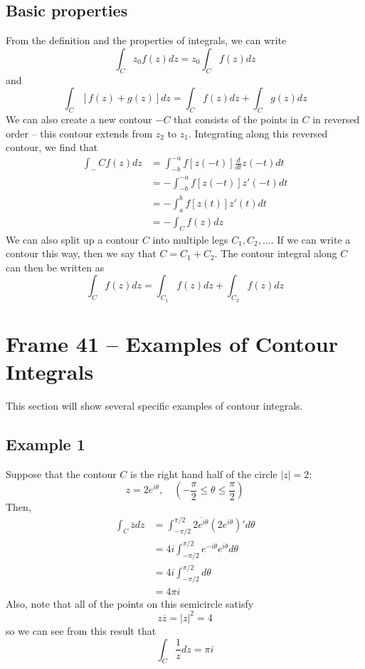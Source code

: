 \documentclass{article}
\renewcommand{\bar}{\overline}
\begin{document}
\subsection{Basic properties}
From the definition and the properties of integrals, we can write
\[
	\int_C z_0 f(z) dz = z_0 \int_C f(z) dz
\]
and
\[
	\int_C [f(z) + g(z)] dz = \int_C f(z) dz + \int_C g(z) dz
\]
We can also create a new contour $-C$ that consists of the points in $C$ in reversed order -- this contour extends from $z_2$ to $z_1$. Integrating along this reversed contour, we find that
\begin{align*}
	\int_-C f(z) dz 
	&= \int_{-b}^{-a} f[z(-t)] \frac{d}{dt} z(-t) dt \\
	&= -\int_{-b}^{-a} f[z(-t)] z'(-t) dt \\
	&= -\int_a^b f[z(t)] z'(t) dt \\
	&= -\int_C f(z) dz
\end{align*}
We can also split up a contour $C$ into multiple legs $C_1, C_2, \dots$. If we can write a contour this way, then we say that $C = C_1 + C_2$. The contour integral along $C$ can then be written as
\[
	\int_C f(z) dz = \int_{C_1} f(z) dz + \int_{C_2} f(z) dz
\]


\clearpage
\section{Frame 41 -- Examples of Contour Integrals}
This section will show several specific examples of contour integrals.

\subsection{Example 1}
Suppose that the contour $C$ is the right hand half of the circle $|z| = 2$:
\[
	z = 2e^{i\theta},	\quad \left( -\frac{\pi}{2} \le \theta \le \frac{\pi}{2}\right)
\]
Then,
\begin{align*}
	\int_C \bar{z} dz
	&= \int_{-\pi/2}^{\pi/2} \bar{2e^{i\theta}} (2e^{i\theta})' d\theta \\
	&= 4i\int_{-\pi/2}^{\pi/2} e^{-i\theta} e^{i\theta} d\theta \\
	&= 4i\int_{-\pi/2}^{\pi/2} d\theta \\
	&= 4\pi i
\end{align*}
Also, note that all of the points on this semicircle satisfy
\[
	z \bar{z} = |z|^2 = 4
\]
so we can see from this result that
\[
	\int_C \frac{1}{z} dz = \pi i
\]
\end{document}
